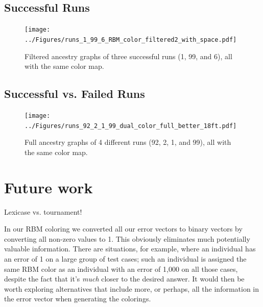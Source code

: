 \documentclass{sig-alternate}
\begin{document}
\subsection{Successful Runs}
\begin{figure}[tb]
	\begin{center}
		\texttt{[image: ../Figures/runs\_1\_99\_6\_RBM\_color\_filtered2\_with\_space.pdf]}
	\end{center}
	\caption{Filtered ancestry graphs of three successful runs (1, 99, and 6), all with the same color map.}
	\label{fig:runs1:99:6:filtered}
\end{figure}


\subsection{Successful vs. Failed Runs}
\begin{figure}[tb]
	\begin{center}
		\texttt{[image: ../Figures/runs\_92\_2\_1\_99\_dual\_color\_full\_better\_18ft.pdf]}
	\end{center}
	\caption{Full ancestry graphs of 4 different runs (92, 2, 1, and 99), all with the same color map.}
	\label{fig:runs92:2:1:99:filtered}
\end{figure}

\section{Future work}
\label{sec:futurework}

Lexicase vs. tournament!

In our RBM coloring we converted all our error vectors to binary vectors by
converting all non-zero values to 1. This obviously eliminates much potentially
valuable information. There are situations, for example, where an individual has
an error of 1 on a large group of test cases; such an individual is assigned
the same RBM color as an individual with an error of 1,000 on all those cases,
despite the fact that it's \emph{much} closer to the desired answer.
It would then be worth exploring alternatives that include
more, or perhaps, all the information in the error vector when generating the
colorings.
\end{document}
